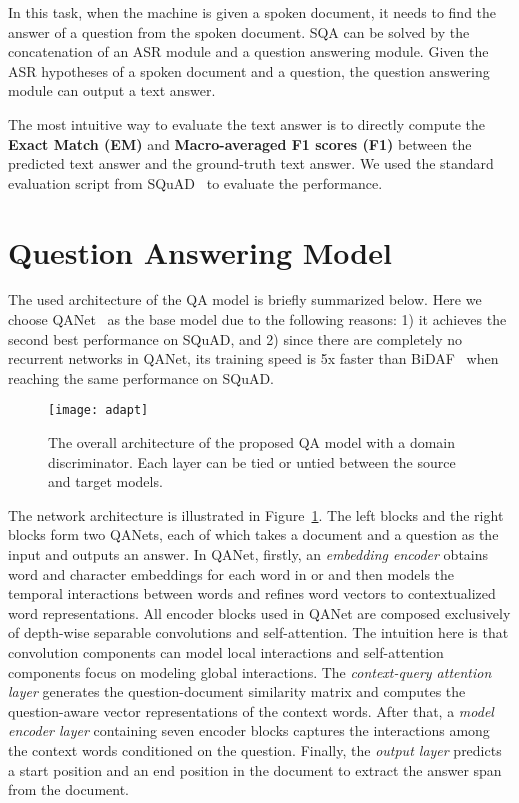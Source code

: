 \documentclass{article}
\begin{document}
In this task, when the machine is given a spoken document, it needs to find the answer of a question from the spoken document. 
SQA can be solved by the concatenation of an ASR module and a question answering module.
Given the ASR hypotheses of a spoken document and a question, the question answering module can output a text answer. 

The most intuitive way to evaluate the text answer is to directly compute the \textbf{Exact Match (EM)} and \textbf{Macro-averaged F1 scores (F1)} between the predicted text answer and the ground-truth text answer.
We used the standard evaluation script from SQuAD~\cite{rajpurkar2016squad} to evaluate the performance. 


\section{Question Answering Model}
\label{sec:QA model}

The used architecture of the QA model is briefly summarized below.
Here we choose QANet~\cite{yu2018qanet} as the base model due to the following reasons:
1) it achieves the second best performance on SQuAD, and
2) since there are completely no recurrent networks in QANet, its training speed is 5x faster than BiDAF~\cite{seo2016bidirectional} when reaching the same performance on SQuAD.

\begin{figure}[t]
  \centering
  \texttt{[image: adapt]}
  \caption{The overall architecture of the proposed QA model with a domain discriminator. 
  Each layer can be tied or untied between the source and target models.}
  \label{fig:GAN}
\end{figure}


The network architecture is illustrated in Figure~\ref{fig:GAN}.
The left blocks and the right blocks form two QANets, each of which takes a document and a question as the input and outputs an answer.
In QANet, firstly, an \emph{embedding encoder} obtains word and character embeddings for each word in  or  and then models the temporal interactions between words and refines word vectors to contextualized word representations. 
All encoder blocks used in QANet are composed exclusively of depth-wise separable convolutions and self-attention.
The intuition here is that convolution components can model local interactions and self-attention components focus on modeling global interactions. 
The \emph{context-query attention layer} generates the question-document similarity matrix and computes the question-aware vector representations of the context words. 
After that, a \emph{model encoder layer} containing seven encoder blocks captures the interactions among the context words conditioned on the question. Finally, the \emph{output layer} predicts a start position and an end position in the document to extract the answer span from the document. 
\end{document}

